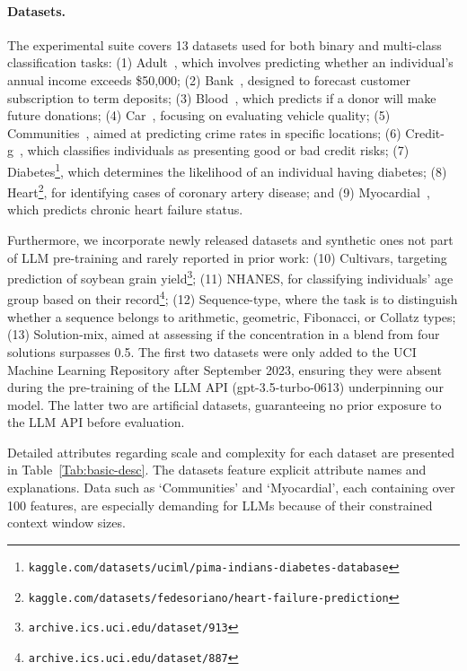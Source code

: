 \paragraph{Datasets.}
The experimental suite covers 13 datasets used for both binary and multi-class classification tasks: (1) Adult~\cite{asuncion2007uci}, which involves predicting whether an individual’s annual income exceeds \$50,000; (2) Bank~\cite{moro2014data}, designed to forecast customer subscription to term deposits; (3) Blood~\cite{yeh2009knowledge}, which predicts if a donor will make future donations; (4) Car~\cite{kadra2021well}, focusing on evaluating vehicle quality; (5) Communities~\cite{misc_communities_and_crime_183}, aimed at predicting crime rates in specific locations; (6) Credit-g~\cite{kadra2021well}, which classifies individuals as presenting good or bad credit risks; (7) Diabetes\footnote{\texttt{kaggle.com/datasets/uciml/pima-indians-diabetes-database}}, which determines the likelihood of an individual having diabetes; (8) Heart\footnote{\texttt{kaggle.com/datasets/fedesoriano/heart-failure-prediction}}, for identifying cases of coronary artery disease; and (9) Myocardial~\cite{misc_myocardial_infarction_complications_579}, which predicts chronic heart failure status. 

Furthermore, we incorporate newly released datasets and synthetic ones not part of LLM pre-training and rarely reported in prior work: (10) Cultivars, targeting prediction of soybean grain yield\footnote{\texttt{archive.ics.uci.edu/dataset/913}}; (11) NHANES, for classifying individuals’ age group based on their record\footnote{\texttt{archive.ics.uci.edu/dataset/887}}; (12) Sequence-type, where the task is to distinguish whether a sequence belongs to arithmetic, geometric, Fibonacci, or Collatz types; (13) Solution-mix, aimed at assessing if the concentration in a blend from four solutions surpasses 0.5. The first two datasets were only added to the UCI Machine Learning Repository after September 2023, ensuring they were absent during the pre-training of the LLM API (gpt-3.5-turbo-0613) underpinning our model. The latter two are artificial datasets, guaranteeing no prior exposure to the LLM API before evaluation.

Detailed attributes regarding scale and complexity for each dataset are presented in Table~\ref{Tab:basic-desc}. The datasets feature explicit attribute names and explanations. Data such as `Communities' and `Myocardial', each containing over 100 features, are especially demanding for LLMs because of their constrained context window sizes.

